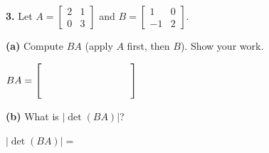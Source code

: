 \documentclass[10pt]{article}
\begin{document}
\vspace{0.10in}

\begin{notesbox}
\textbf{3.} Let $A=\begin{bmatrix}2&1\\0&3\end{bmatrix}$ and
$B=\begin{bmatrix}1&0\\-1&2\end{bmatrix}$.

\vspace{0.06in}
\textbf{(a)} Compute $BA$ (apply $A$ first, then $B$). Show your work.


$BA = \begin{bmatrix}\hspace{1.4cm}&\hspace{1.4cm}\\[10pt]\hspace{1.4cm}&\hspace{1.4cm}\end{bmatrix}$

\vspace{0.10in}
\textbf{(b)} What is $|\det(BA)|$?

\vspace{0.06in}
$|\det(BA)| = $ \blank{3cm}
\end{notesbox}

\vspace{0.10in}
\end{document}
